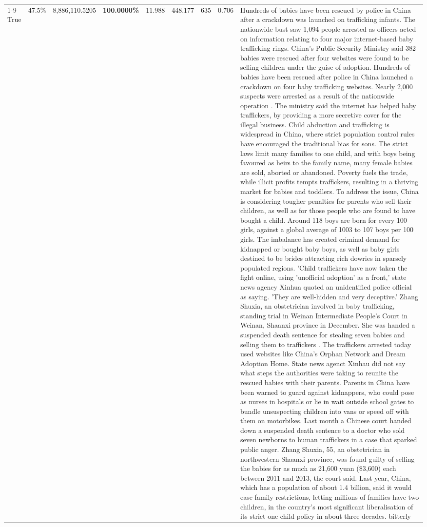 \begin{table}[H]
\begin{tabular}{lllrlllll}
\cline{1-9}
True & 47.5\% & 8,886,110.5205 & \bfseries \color{red} 100.0000\% & 11.988 & 448.177 & 635 & 0.706 & Hundreds of babies have been rescued by police in China after a crackdown was launched on trafficking infants. The nationwide bust saw 1,094 people arrested as officers acted on information relating to four major internet-based baby trafficking rings. China's Public Security Ministry said 382 babies were rescued after four websites were found to be selling children under the guise of adoption. Hundreds of babies have been rescued after police in China launched a crackdown on four baby trafficking websites. Nearly 2,000 suspects were arrested as a result of the nationwide operation . The ministry said the internet has helped baby traffickers, by providing a more secretive cover for the illegal business. Child abduction and trafficking is widespread in China, where strict population control rules have encouraged the traditional bias for sons. The strict laws limit many families to one child, and with boys being favoured as heirs to the family name, many female babies are sold, aborted or abandoned. Poverty fuels the trade, while illicit profits tempts traffickers, resulting in a thriving market for babies and toddlers. To address the issue, China is considering tougher penalties for parents who sell their children, as well as for those people who are found to have bought a child. Around 118 boys are born for every 100 girls, against a global average of 1003 to 107 boys per 100 girls. The imbalance has created criminal demand for kidnapped or bought baby boys, as well as baby girls destined to be brides attracting rich dowries in sparsely populated regions. 'Child traffickers have now taken the fight online, using 'unofficial adoption' as a front,' state news agency Xinhua quoted an unidentified police official as saying. 'They are well-hidden and very deceptive.' Zhang Shuxia, an obstetrician involved in baby trafficking, standing trial in Weinan Intermediate People's Court in Weinan, Shaanxi province in December. She was handed a suspended death sentence for stealing seven babies and selling them to traffickers . The traffickers arrested today used websites like China's Orphan Network and Dream Adoption Home. State news agenct Xinhau did not say what steps the authorities were taking to reunite the rescued babies with their parents. Parents in China have been warned to guard against kidnappers, who could pose as nurses in hospitals or lie in wait outside school gates to bundle unsuspecting children into vans or speed off with them on motorbikes. Last month a Chinese court handed down a suspended death sentence to a doctor who sold seven newborns to human traffickers in a case that sparked public anger. Zhang Shuxia, 55, an obstetrician in northwestern Shaanxi province, was found guilty of selling the babies for as much as 21,600 yuan (\$3,600) each between 2011 and 2013, the court said. Last year, China, which has a population of about 1.4 billion, said it would ease family restrictions, letting millions of families have two children, in the country's most significant liberalisation of its strict one-child policy in about three decades. bitterly \\

\end{tabular}
\end{table}
